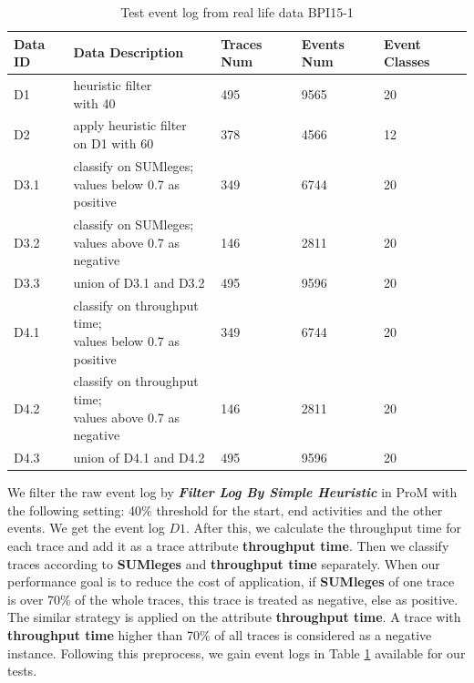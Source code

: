 \begin{table}[h]	
	\caption{Test event log from real life data BPI15-1}
	\label{tab:event-log}
	\begin{tabular}{|l|l|l|l|l|}
		\hline
		Data ID & Data Description                                & Traces Num & Events Num & Event Classes \\ \hline
		D1      & \makecell{heuristic filter  \\ with 40 }                     & 495        & 9565       & 20             \\ \hline
		D2      & \makecell{apply heuristic filter \\ on D1 with 60      }     & 378        & 4566       & 12            \\ \hline
		D3.1    & \makecell{classify on SUMleges;  \\ values below 0.7 as positive} & 349        & 6744       & 20             \\ \hline
		D3.2    & \makecell{classify on SUMleges;  \\ values above 0.7 as negative }& 146        & 2811       & 20             \\  \hline
		D3.3    & union of D3.1 and D3.2                             & 495        & 9596       & 20             \\ \hline
		D4.1    & \makecell{ classify on throughput time;  \\ values below 0.7 as positive} & 349        & 6744       & 20             \\ \hline
		D4.2    & \makecell{classify on throughput time;  \\ values above 0.7 as negative} & 146        & 2811       & 20            \\ \hline
		D4.3    & union of D4.1 and D4.2                             & 495        & 9596       & 20           \\ \hline
	\end{tabular}
\end{table}

We filter the raw event log by \textbf{\emph{Filter Log By Simple Heuristic}} in ProM with the following setting: 40\% threshold for the start, end  activities and the other events. We get the event log $D1$. After this, we calculate the throughput time for each trace and add it as a trace attribute \textbf{throughput time}. 
Then we classify traces according to  \textbf{SUMleges} and  \textbf{throughput time} separately. When our performance goal is to reduce the cost of application, if \textbf{SUMleges} of one trace is over 70\% of the whole traces, this trace is treated as negative, else as positive. The similar strategy is applied on the attribute \textbf{throughput time}. A trace with \textbf{throughput time} higher than 70\% of all traces is considered as a negative instance. Following this preprocess, we gain event logs in Table \ref{tab:event-log} available for our tests. 


